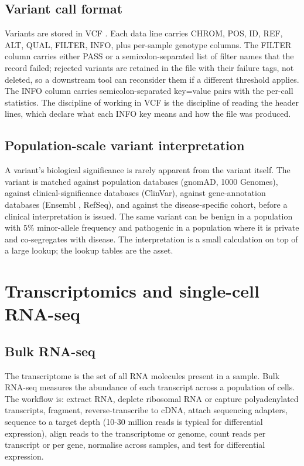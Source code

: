 \subsection{Variant call format}

Variants are stored in VCF \cite{paper:v6c11-danecek-vcf-2011}. Each
data line carries CHROM, POS, ID, REF, ALT, QUAL, FILTER, INFO, plus
per-sample genotype columns. The FILTER column carries either PASS or
a semicolon-separated list of filter names that the record failed;
rejected variants are retained in the file with their failure tags,
not deleted, so a downstream tool can reconsider them if a different
threshold applies. The INFO column carries semicolon-separated
key=value pairs with the per-call statistics. The discipline of
working in VCF is the discipline of reading the header lines, which
declare what each INFO key means and how the file was produced.

\subsection{Population-scale variant interpretation}

A variant's biological significance is rarely apparent from the
variant itself. The variant is matched against population databases
(gnomAD, 1000 Genomes), against clinical-significance databases
(ClinVar), against gene-annotation databases (Ensembl
\cite{paper:v6c11-ensembl-2023}, RefSeq), and against the
disease-specific cohort, before a clinical interpretation is issued.
The same variant can be benign in a population with $5\%$ minor-allele
frequency and pathogenic in a population where it is private and
co-segregates with disease. The interpretation is a small calculation
on top of a large lookup; the lookup tables are the asset.

\section{Transcriptomics and single-cell RNA-seq}

\subsection{Bulk RNA-seq}

The transcriptome is the set of all RNA molecules present in a sample.
Bulk RNA-seq measures the abundance of each transcript across a
population of cells. The workflow is: extract RNA, deplete ribosomal
RNA or capture polyadenylated transcripts, fragment, reverse-transcribe
to cDNA, attach sequencing adapters, sequence to a target depth (10-30
million reads is typical for differential expression), align reads to
the transcriptome or genome, count reads per transcript or per gene,
normalise across samples, and test for differential expression.


